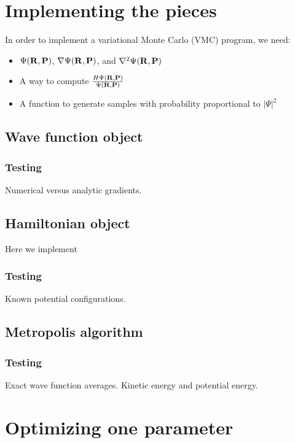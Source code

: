 \documentclass[12pt]{article}
\newcommand{\bR}{{\bf R}}
\newcommand{\bP}{{\bf P}}
\begin{document}
\section{Implementing the pieces}

In order to implement a variational Monte Carlo (VMC) program, we need:
\begin{itemize}
	\item $\Psi(\bR,\bP)$, $\nabla \Psi(\bR,\bP)$, and $\nabla^2 \Psi(\bR,\bP)$
	\item A way to compute $\frac{H\Psi(\bR,\bP)}{\Psi(\bR,\bP)}$
	\item A function to generate samples with probability proportional to $|\Psi|^2$
\end{itemize}

\subsection{Wave function object}

\subsubsection{Testing}

Numerical versus analytic gradients.

\subsection{Hamiltonian object}

Here we implement 

\subsubsection{Testing}

Known potential configurations.

\subsection{Metropolis algorithm}

\subsubsection{Testing}

Exact wave function averages. Kinetic energy and potential energy.

\section{Optimizing one parameter}
\end{document}
